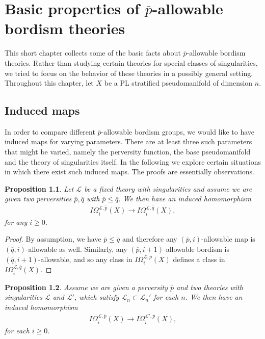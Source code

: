 \documentclass{scrreprt}
\newtheorem{prop}{Proposition}[chapter]
\begin{document}
\chapter{Basic properties of $\overline{p}$-allowable bordism theories}

This short chapter collects some of the basic facts about $\overline{p}$-allowable bordism theories. Rather than studying certain theories for special classes of singularities, we tried to focus on the behavior of these theories in a possibly general setting.
Throughout this chapter, let $X$ be a PL stratified pseudomanifold of dimension $n$.
\section{Induced maps}

In order to compare different $\overline{p}$-allowable bordism groups, we would like to have induced maps for varying parameters. There are at least three such parameters that might be varied, namely the perversity function, the base pseudomanifold and the theory of singularities itself. In the following we explore certain situations in which there exist such induced maps. The proofs are essentially observations.

\begin{prop}
Let $\mathcal{L}$ be a fixed theory with singularities and assume we are given two perversities $\overline{p}, \overline{q}$ with $\overline{p} \leq \overline{q}$. We then have an induced homomorphism
\begin{align*}
I \Omega_i^{\mathcal{L}, \overline{p}}(X) \to I \Omega_i^{\mathcal{L}, \overline{q}}(X),
\end{align*}
for any $i \geq 0$.
\end{prop}

\begin{proof}
By assumption, we have $\overline{p} \leq \overline{q}$ and therefore any $(\overline{p},i)$-allowable map is $(\overline{q},i)$-allowable as well. Similarly, any $(\overline{p},i+1)$-allowable bordism is $(\overline{q},i+1)$-allowable, and so any class in $I \Omega_i^{\mathcal{L}, \overline{p}}(X)$ defines a class in $I \Omega_i^{\mathcal{L}, \overline{q}}(X)$.
\end{proof}

\begin{prop}
Assume we are given a perversity $\overline{p}$ and two theories with singularities $\mathcal{L}$ and $\mathcal{L'}$, which satisfy $\mathcal{L}_n \subset \mathcal{L}_n'$ for each $n$. We then have an induced homomorphism 
\begin{align*}
I \Omega_i^{\mathcal{L}, \overline{p}}(X) \to I \Omega_i^{\mathcal{L'}, \overline{p}}(X),
\end{align*}
for each $i \geq 0$.
\end{prop}
\end{document}
